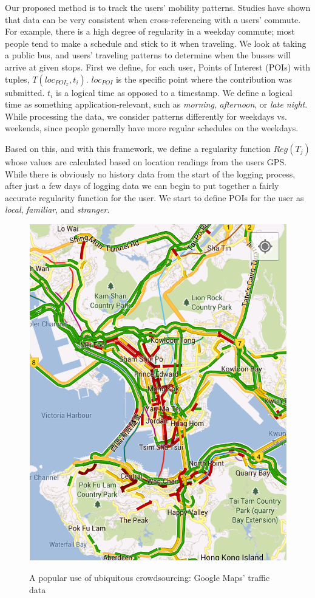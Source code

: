 \documentclass{sig-alternate-05-2015}
\begin{document}
	Our proposed method is to track the users' mobility patterns. Studies have shown that data can be very consistent when cross-referencing with a users' commute. For example, there is a high degree of regularity in a weekday commute; most people tend to make a schedule and stick to it when traveling. \cite{rhee2011levy}
	We look at taking a public bus, and users' traveling patterns to determine when the busses will arrive at given stops. First we define, for each user, Points of Interest (POIs) with tuples, $T(loc_{POI_x}, t_i)$. $loc_{POI}$ is the specific point where the contribution was submitted. $t_i$ is a logical time as opposed to a timestamp. We define a logical time as something application-relevant, such as \emph{morning}, \emph{afternoon}, or \emph{late night}.
	While processing the data, we consider patterns differently for weekdays vs. weekends, since people generally have more regular schedules on the weekdays.
	
	Based on this, and with this framework, we define a regularity function $Reg(T_j)$ whose values are calculated based on location readings from the users GPS.
	While there is obviously no history data from the start of the logging process, after just a few days of logging data we can begin to put together a fairly accurate regularity function for the user. We start to define POIs for the user as \emph{local}, \emph{familiar}, and \emph{stranger}. 
	
	\begin{figure}
		\centering \includegraphics[width=0.7\columnwidth]{maps-traffic}
		\label{fig-traffic}
		\caption{A popular use of ubiquitous crowdsourcing: Google Maps' traffic data}
	\end{figure}
	
\end{document}
